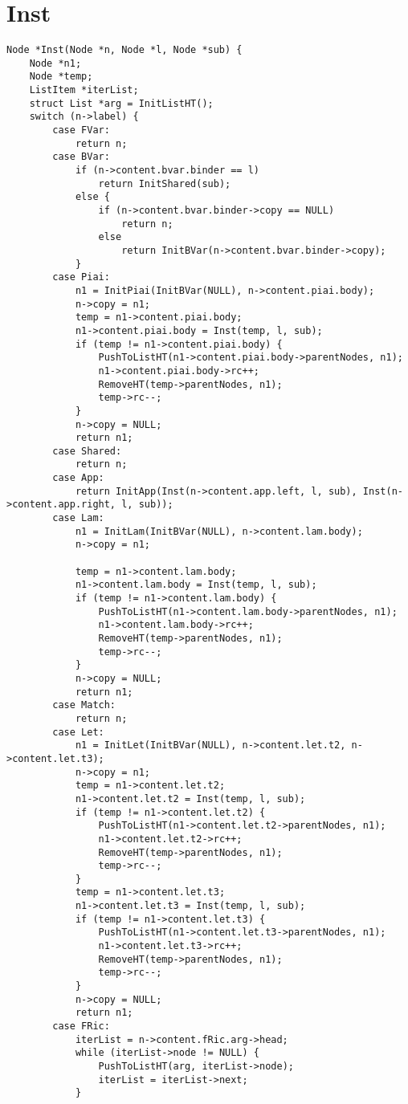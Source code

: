 \documentclass[12pt,a4paper,openright,twoside]{report}
\begin{document}
\section{Inst}
\begin{verbatim}
Node *Inst(Node *n, Node *l, Node *sub) {
    Node *n1;
    Node *temp;
    ListItem *iterList;
    struct List *arg = InitListHT();
    switch (n->label) {
        case FVar:
            return n;
        case BVar:
            if (n->content.bvar.binder == l)
                return InitShared(sub);
            else {
                if (n->content.bvar.binder->copy == NULL)
                    return n;
                else
                    return InitBVar(n->content.bvar.binder->copy);
            }
        case Piai:
            n1 = InitPiai(InitBVar(NULL), n->content.piai.body);
            n->copy = n1;
            temp = n1->content.piai.body;
            n1->content.piai.body = Inst(temp, l, sub);
            if (temp != n1->content.piai.body) {
                PushToListHT(n1->content.piai.body->parentNodes, n1);
                n1->content.piai.body->rc++;
                RemoveHT(temp->parentNodes, n1);
                temp->rc--;
            }
            n->copy = NULL;
            return n1;
        case Shared:
            return n;
        case App:
            return InitApp(Inst(n->content.app.left, l, sub), Inst(n->content.app.right, l, sub));
        case Lam:
            n1 = InitLam(InitBVar(NULL), n->content.lam.body);
            n->copy = n1;

            temp = n1->content.lam.body;
            n1->content.lam.body = Inst(temp, l, sub);
            if (temp != n1->content.lam.body) {
                PushToListHT(n1->content.lam.body->parentNodes, n1);
                n1->content.lam.body->rc++;
                RemoveHT(temp->parentNodes, n1);
                temp->rc--;
            }
            n->copy = NULL;
            return n1;
        case Match:
            return n;
        case Let:
            n1 = InitLet(InitBVar(NULL), n->content.let.t2, n->content.let.t3);
            n->copy = n1;
            temp = n1->content.let.t2;
            n1->content.let.t2 = Inst(temp, l, sub);
            if (temp != n1->content.let.t2) {
                PushToListHT(n1->content.let.t2->parentNodes, n1);
                n1->content.let.t2->rc++;
                RemoveHT(temp->parentNodes, n1);
                temp->rc--;
            }
            temp = n1->content.let.t3;
            n1->content.let.t3 = Inst(temp, l, sub);
            if (temp != n1->content.let.t3) {
                PushToListHT(n1->content.let.t3->parentNodes, n1);
                n1->content.let.t3->rc++;
                RemoveHT(temp->parentNodes, n1);
                temp->rc--;
            }
            n->copy = NULL;
            return n1;
        case FRic:
            iterList = n->content.fRic.arg->head;
            while (iterList->node != NULL) {
                PushToListHT(arg, iterList->node);
                iterList = iterList->next;
            }


\end{verbatim}
\end{document}
